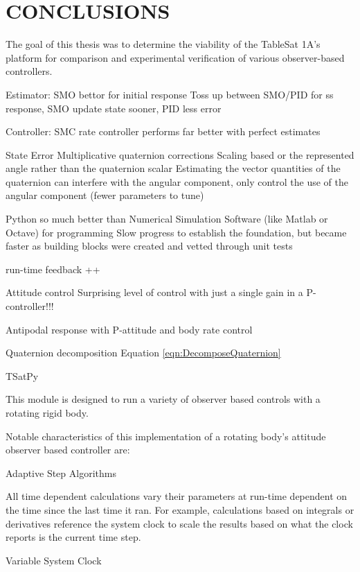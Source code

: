 \chapter{CONCLUSIONS}
\label{chap:Conclusions}

The goal of this thesis was to determine the viability of the TableSat 1A's platform for comparison and experimental verification of various observer-based controllers.


Estimator:
  SMO bettor for initial response
  Toss up between SMO/PID for ss response, SMO update state sooner, PID less error

Controller:
  SMC rate controller performs far better with perfect estimates

State Error
  Multiplicative quaternion corrections
  Scaling based or the represented angle rather than the quaternion scalar
  Estimating the vector quantities of the quaternion can interfere with the angular component, only control the use of the angular component (fewer parameters to tune)

Python so much better than Numerical Simulation Software (like Matlab or Octave) for programming
Slow progress to establish the foundation, but became faster as building blocks were created and vetted through unit tests

run-time feedback ++

Attitude control
  Surprising level of control with just a single gain in a P-controller!!!


Antipodal response with P-attitude and body rate control

Quaternion decomposition Equation \ref{eqn:DecomposeQuaternion}



TSatPy

This module is designed to run a variety of observer based controls with a rotating rigid body.

Notable characteristics of this implementation of a rotating body's attitude observer based controller are:

Adaptive Step Algorithms

All time dependent calculations vary their parameters at run-time dependent on the time since the last time it ran. For example, calculations based on integrals or derivatives reference the system clock to scale the results based on what the clock reports is the current time step.

Variable System Clock

